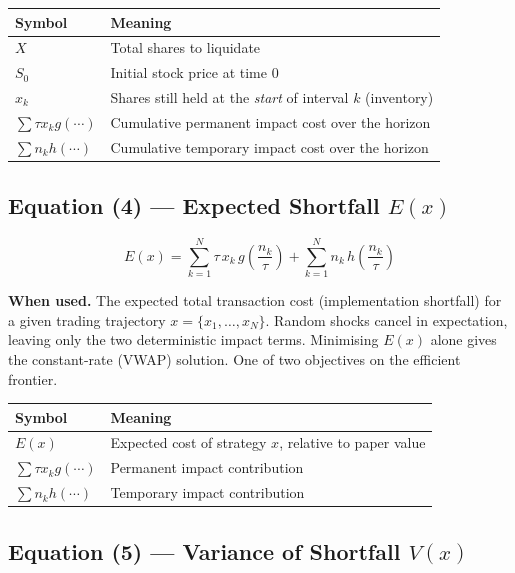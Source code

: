 \documentclass[11pt,a4paper]{article}
\begin{document}
\begin{center}
\begin{tabular}{@{}L{3.5cm}L{10cm}@{}}
\toprule
\textbf{Symbol} & \textbf{Meaning} \\
\midrule
$X$ & Total shares to liquidate \\
$S_0$ & Initial stock price at time $0$ \\
$x_k$ & Shares still held at the \emph{start} of interval $k$ (inventory) \\
$\sum \tau x_k g(\cdots)$ & Cumulative permanent impact cost over the horizon \\
$\sum n_k h(\cdots)$ & Cumulative temporary impact cost over the horizon \\
\bottomrule
\end{tabular}
\end{center}

\subsection*{Equation (4) — Expected Shortfall $E(x)$}

\begin{equation}
  E(x) = \sum_{k=1}^{N} \tau\,x_k\,g\!\left(\frac{n_k}{\tau}\right)
        + \sum_{k=1}^{N} n_k\,h\!\left(\frac{n_k}{\tau}\right)
\end{equation}

\textbf{When used.} The expected total transaction cost (implementation shortfall) for a
given trading trajectory $x=\{x_1,\ldots,x_N\}$.  Random shocks cancel in expectation,
leaving only the two deterministic impact terms.  Minimising $E(x)$ alone gives the
constant-rate (VWAP) solution.  One of two objectives on the efficient frontier.

\begin{center}
\begin{tabular}{@{}L{3.5cm}L{10cm}@{}}
\toprule
\textbf{Symbol} & \textbf{Meaning} \\
\midrule
$E(x)$ & Expected cost of strategy $x$, relative to paper value \\
$\sum \tau x_k g(\cdots)$ & Permanent impact contribution \\
$\sum n_k h(\cdots)$ & Temporary impact contribution \\
\bottomrule
\end{tabular}
\end{center}

\subsection*{Equation (5) — Variance of Shortfall $V(x)$}
\end{document}
